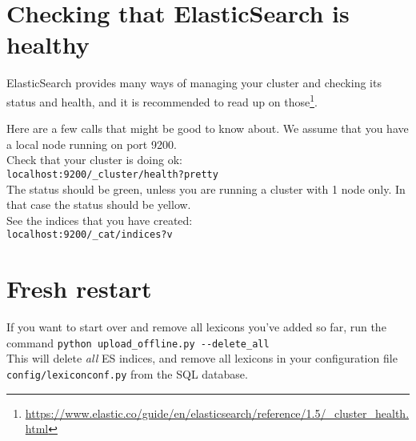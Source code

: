 \documentclass[
12pt, %
a4paper, %
oneside, %
headinclude,footinclude, %
BCOR0mm, %
]{scrartcl}
\begin{document}
\section{Checking that ElasticSearch is healthy}
ElasticSearch provides many ways of managing your cluster and
checking its status and health, and
it is recommended to read up on those\footnote{%
\url{https://www.elastic.co/guide/en/elasticsearch/reference/1.5/_cluster_health.html}}.

Here are a few calls that might be good to know about. We assume
that you have a local node running on port 9200.\\
Check that your cluster is doing ok:\\
\verb|localhost:9200/_cluster/health?pretty|\\
The status should be green, unless you are running a cluster with
1 node only. In that case the status should be yellow.\\
See the indices that you have created:\\
\verb|localhost:9200/_cat/indices?v|\\

\section{Fresh restart}
If you want to start over and remove all lexicons you've added so far, run the command
\verb|python upload_offline.py --delete_all|\\
This will delete \textit{all} ES indices, and remove all lexicons in your
configuration file \\
\verb|config/lexiconconf.py| from the SQL database.



%
\end{document}
